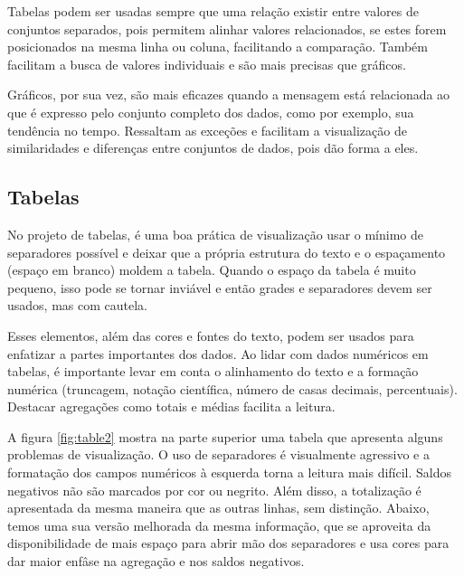 \documentclass[]{article}
\begin{document}
Tabelas podem ser usadas sempre que uma relação existir entre valores de conjuntos separados, pois permitem alinhar valores relacionados, se estes forem posicionados na mesma linha ou coluna, facilitando a comparação. Também facilitam a busca de valores individuais e são mais precisas que gráficos.

Gráficos, por sua vez, são mais eficazes quando a mensagem está relacionada ao que é expresso pelo conjunto completo dos dados, como por exemplo, sua tendência no tempo. Ressaltam as exceções e facilitam a visualização de similaridades e diferenças entre conjuntos de dados, pois dão forma a eles.

\subsection{Tabelas} 

No projeto de tabelas, é uma boa prática de visualização usar o mínimo de separadores possível e deixar que a própria estrutura do texto e o espaçamento (espaço em branco) moldem a tabela. Quando o espaço da tabela é muito pequeno, isso pode se tornar inviável e então grades e separadores devem ser usados, mas com cautela.

Esses elementos, além das cores e fontes do texto, podem ser usados para enfatizar a partes importantes dos dados. Ao lidar com dados numéricos em tabelas, é importante levar em conta o alinhamento do texto e a formação numérica (truncagem, notação científica, número de casas decimais, percentuais). Destacar agregações como totais e médias facilita a leitura.

A figura \ref{fig:table2} mostra na parte superior uma tabela que apresenta alguns problemas de visualização. O uso de separadores é visualmente agressivo e a formatação dos campos numéricos à esquerda torna a leitura mais difícil. Saldos negativos não são marcados por cor ou negrito. Além disso, a totalização é apresentada da mesma maneira que as outras linhas, sem distinção.  Abaixo, temos uma sua versão melhorada da mesma informação, que se aproveita da disponibilidade de mais espaço para abrir mão dos separadores e usa cores para dar maior enfâse na agregação e nos saldos negativos.
\end{document}
